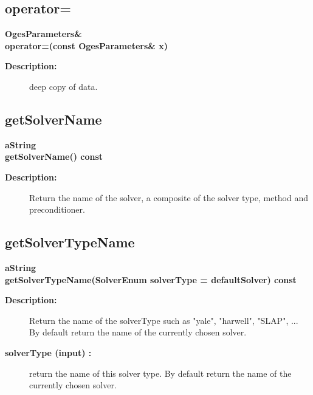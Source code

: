 \subsection{operator=}
 
\newlength{\OgesParametersIncludeArgIndent}
\begin{flushleft} \textbf{%
OgesParameters\&   \\ 
\settowidth{\OgesParametersIncludeArgIndent}{operator=(}%
operator=(const OgesParameters\& x)
}\end{flushleft}
\begin{description}
\item[{\bf Description:}] 
   deep copy of data.

\end{description}
\subsection{getSolverName}
 
\begin{flushleft} \textbf{%
aString  \\ 
\settowidth{\OgesParametersIncludeArgIndent}{getSolverName(}%
getSolverName() const                   
}\end{flushleft}
\begin{description}
\item[{\bf Description:}] 
  Return the name of the solver, a composite of the solver type, method and preconditioner.
\end{description}
\subsection{getSolverTypeName}
 
\begin{flushleft} \textbf{%
aString  \\ 
\settowidth{\OgesParametersIncludeArgIndent}{getSolverTypeName(}%
getSolverTypeName(SolverEnum solverType  = defaultSolver) const
}\end{flushleft}
\begin{description}
\item[{\bf Description:}] 
   Return the name of the solverType such as "yale", "harwell", "SLAP", ...
 By default return the name of the currently chosen solver.
\item[{\bf solverType (input) :}]  return the name of this solver type.
    By default return the name of the currently chosen solver.
\end{description}

